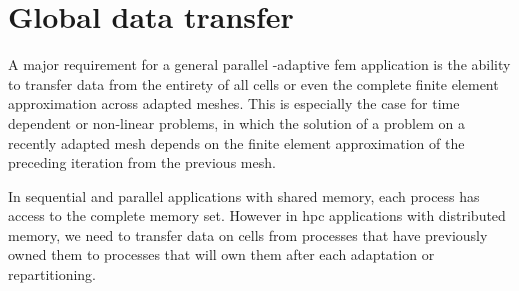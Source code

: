 \section{Global data transfer}
\label{sec:transfer}




A major requirement for a general parallel \hp-adaptive \gls{fem} application is the ability to transfer data from the entirety of all cells or even the complete finite element approximation across adapted meshes. This is especially the case for time dependent or non-linear problems, in which the solution of a problem on a recently adapted mesh depends on the finite element approximation of the preceding iteration from the previous mesh.






In sequential and parallel applications with shared memory, each process has access to the complete memory set. However in \gls{hpc} applications with distributed memory, we need to transfer data on cells from processes that have previously owned them to processes that will own them after each adaptation or repartitioning.

